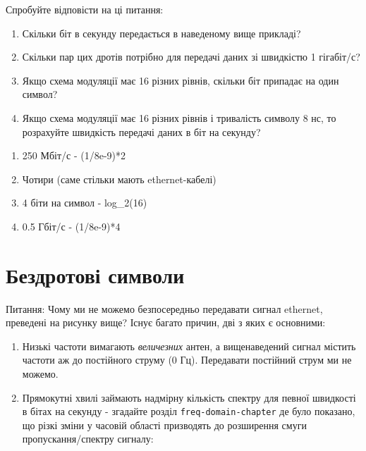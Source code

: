 \href{../_images/ethernet.svg}{}

Спробуйте відповісти на ці питання:

\begin{enumerate}
\def\labelenumi{\arabic{enumi}.}
\tightlist
\item
  Скільки біт в секунду передається в наведеному вище прикладі?
\item
  Скільки пар цих дротів потрібно для передачі даних зі швидкістю 1
  гігабіт/с?
\item
  Якщо схема модуляції має 16 різних рівнів, скільки біт припадає на
  один символ?
\item
  Якщо схема модуляції має 16 різних рівнів і тривалість символу 8 нс,
  то розрахуйте швидкість передачі даних в біт на секунду?
\end{enumerate}

\begin{enumerate}
\def\labelenumi{\arabic{enumi}.}
\tightlist
\item
  250 Мбіт/с - (1/8e-9)*2
\item
  Чотири (саме стільки мають ethernet-кабелі)
\item
  4 біти на символ - log\_2(16)
\item
  0.5 Гбіт/с - (1/8e-9)*4
\end{enumerate}

\section{Бездротові
символи}\label{ux431ux435ux437ux434ux440ux43eux442ux43eux432ux456-ux441ux438ux43cux432ux43eux43bux438}

Питання: Чому ми не можемо безпосередньо передавати сигнал ethernet,
преведені на рисунку вище? Існує багато причин, дві з яких є основними:

\begin{enumerate}
\def\labelenumi{\arabic{enumi}.}
\tightlist
\item
  Низькі частоти вимагають \emph{величезних} антен, а вищенаведений
  сигнал містить частоти аж до постійного струму (0 Гц). Передавати
  постійний струм ми не можемо.
\item
  Прямокутні хвилі займають надмірну кількість спектру для певної
  швидкості в бітах на секунду - згадайте розділ
  \texttt{freq-domain-chapter} де було показано, що різкі зміни у
  часовій області призводять до розширення смуги пропускання/спектру
  сигналу:
\end{enumerate}

